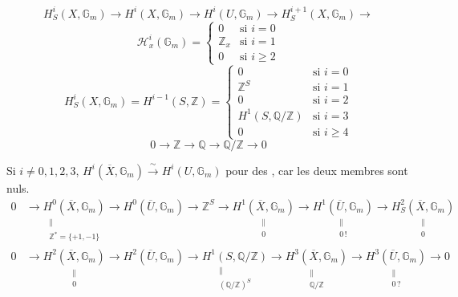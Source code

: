 \documentclass[11pt,a4paper]{article}
\begin{document}
\[
  H^{i}_{S}(X, \mathbb{G}_{m}) \to H^{i}(X, \mathbb{G}_{m}) \to H^{i}(U,
  \mathbb{G}_{m}) \to H^{i+1}_{S}(X, \mathbb{G}_{m}) \to
\]
\[
  \mathcal{H}^{i}_{x}(\mathbb{G}_{m}) =
  \begin{cases}
    0 & \text{si } i = 0 \\
    \mathbb{Z}_{x} & \text{si } i = 1 \\
    0 & \text{si } i \geq 2
  \end{cases}
\]
\[
  H^{i}_{S}(X, \mathbb{G}_{m}) = H^{i-1}(S, \mathbb{Z}) =
  \begin{cases}
    0 & \text{si } i = 0 \\
    \mathbb{Z}^{S} & \text{si } i = 1 \\
    0 & \text{si } i = 2 \\
    H^{1}(S, \mathbb{Q}/\mathbb{Z}) & \text{si } i = 3 \\
    0 & \text{si } i \geq 4
  \end{cases}
\]
\[
  0 \to \mathbb{Z} \to \mathbb{Q} \to \mathbb{Q}/\mathbb{Z} \to 0
\]


Si $i \neq 0, 1, 2, 3$, $H^{i}(\overline{X}, \mathbb{G}_{m})
\xrightarrow{\ \sim\ } H^{i}(U, \mathbb{G}_{m})$ pour des \ill{}, car les deux
membres sont nuls.
\[
\begin{aligned}
  0 &\to \underset{\substack{\parallel \\ \mathbb{Z}^{*} = \{+1, -1\}}}{H^{0}(\overline{X}, \mathbb{G}_{m})}
  \to H^{0}(\overline{U}, \mathbb{G}_{m}) \to \mathbb{Z}^{S}
  \to \underset{\substack{\parallel \\ 0}}{H^{1}(\overline{X}, \mathbb{G}_{m})}
  \to \underset{\substack{\parallel \\ 0\,!}}{H^{1}(\overline{U}, \mathbb{G}_{m})}
  \to \underset{\substack{\parallel \\ 0}}{H^{2}_{S}(\overline{X}, \mathbb{G}_{m})} \\
  0 &\to \underset{\substack{\parallel \\ 0}}{H^{2}(\overline{X}, \mathbb{G}_{m})}
  \to H^{2}(\overline{U}, \mathbb{G}_{m})
  \to \underset{\substack{\parallel \\ (\mathbb{Q}/\mathbb{Z})^{S}}}{H^{1}(S, \mathbb{Q}/\mathbb{Z})}
  \to \underset{\substack{\parallel \\ \mathbb{Q}/\mathbb{Z}}}{H^{3}(\overline{X}, \mathbb{G}_{m})}
  \to \underset{\substack{\parallel \\ 0\,?}}{H^{3}(\overline{U}, \mathbb{G}_{m})} \to 0
\end{aligned}
\]
\end{document}
